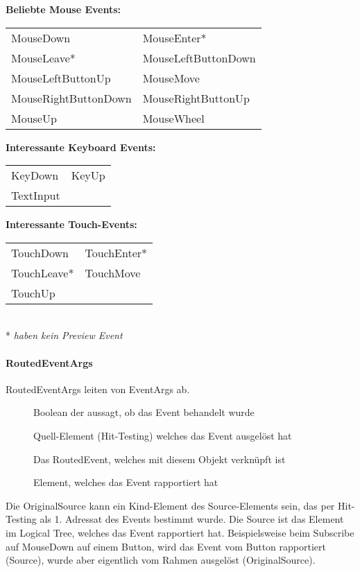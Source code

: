 \textbf{Beliebte Mouse Events:}
\begin{tabular}{ll}
MouseDown & MouseEnter* \\
MouseLeave* & MouseLeftButtonDown \\
MouseLeftButtonUp & MouseMove \\
MouseRightButtonDown & MouseRightButtonUp \\
MouseUp & MouseWheel
\end{tabular}

\textbf{Interessante Keyboard Events:} \\
\begin{tabular}{ll}
KeyDown & KeyUp \\
TextInput & 
\end{tabular}

\textbf{Interessante Touch-Events:} \\
\begin{tabular}{ll}
TouchDown & TouchEnter* \\
TouchLeave* & TouchMove \\
TouchUp & 
\end{tabular}
\\
* \textit{haben kein Preview Event}


\paragraph{RoutedEventArgs} RoutedEventArgs leiten von EventArgs ab. 
\begin{description}
\item[] Boolean der aussagt, ob das Event behandelt wurde
\item[] Quell-Element (Hit-Testing) welches das Event ausgelöst hat
\item[] Das RoutedEvent, welches mit diesem Objekt verknüpft ist
\item[] Element, welches das Event rapportiert hat
\end{description}

Die OriginalSource kann ein Kind-Element des Source-Elements sein, das per Hit-Testing als 1. Adressat des Events bestimmt wurde. Die Source ist das Element im Logical Tree, welches das Event rapportiert hat. Beispielsweise beim Subscribe auf MouseDown auf einem Button, wird das Event vom Button rapportiert (Source), wurde aber eigentlich vom Rahmen ausgelöst (OriginalSource).

